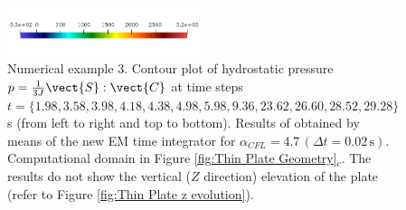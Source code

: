 \begin{figure}[hbtp!]
\begin{tabular}{ccc}
	\end{tabular}
	\includegraphics[width=0.5\textwidth]{Figures/Example2/Pressure/ColorBarv2} 		
	\caption{Numerical example 3. Contour plot of hydrostatic pressure $p=\frac{1}{3J}\vect{S}:\vect{C}$  at time steps $t=\{1.98,3.58,3.98,4.18,4.38,4.98,5.98,9.36,23.62,26.60,28.52,29.28\}$ s (from left to right and top to bottom). Results of obtained by means of the new EM time integrator for $\alpha_{CFL}=4.7\,(\Delta t = 0.02\,\text{s})$. Computational domain in Figure \ref{fig:Thin Plate Geometry}$_c$. The results do not show the vertical ($Z$ direction) elevation of the plate (refer to Figure \ref{fig:Thin Plate z evolution}).}
	\label{fig:example 2 pressure 1}
\end{figure}





